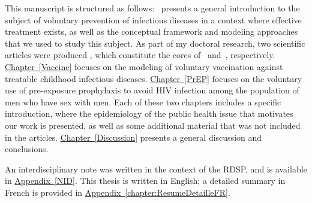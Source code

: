 This manuscript is structured as follows:~ presents a general introduction to the subject of voluntary prevention of infectious diseases in a context where effective treatment exists, as well as the conceptual framework and modeling approaches that we used to study this subject. As part of my doctoral research, two scientific articles were 
produced \cite[]{Jijon2017,Jijon2021}, which constitute the cores of~ and~, respectively. \hyperlink{Vaccine}{Chapter~\ref*{Vaccine}} focuses on the modeling of voluntary vaccination against treatable childhood infectious diseases. \hyperlink{PrEP}{Chapter~\ref*{PrEP}} focuses on the voluntary use of pre-exposure prophylaxis to avoid HIV infection among the population of men who have sex with men. Each of these two chapters includes a specific introduction, where the epidemiology of the public health issue that motivates our work is presented, as well as some additional material that was not included in the articles. \hyperlink{Discussion}{Chapter~\ref*{Discussion}} presents a general discussion and conclusions. 

An interdisciplinary note was written in the context of the RDSP, and is available in \hyperlink{NID}{Appendix~\ref*{NID}}. This thesis is written in English; a detailed summary in French is provided in \hyperlink{chapter:ResumeDetailleFR}{Appendix~\ref*{chapter:ResumeDetailleFR}}.